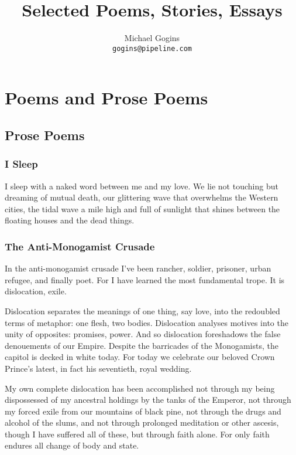\documentclass[english,11pt,letterpaper,onecolumn]{scrbook}
\begin{document}
\pagestyle{plain}
\frontmatter

\title{Selected Poems, Stories, Essays}
\author{Michael Gogins \\ \texttt{gogins@pipeline.com}}
\maketitle

\tableofcontents
\mainmatter
\pagestyle{headings}

\part{Poems and Prose Poems}

\chapter{Prose Poems}

\section{I Sleep}

	I sleep with a naked word between me and my love.  We lie not touching but dreaming of mutual death, our glittering wave that overwhelms the Western cities, the tidal wave a mile high and full of sunlight that shines between the floating houses and the dead things.



\newpage
\section{The Anti-Monogamist Crusade}

	In the anti-monogamist crusade I've been rancher, soldier, prisoner, urban refugee, and finally poet.  For I have learned the most fundamental trope.  It is dislocation, exile.

	Dislocation separates the meanings of one thing, say love, into the redoubled terms of metaphor:  one flesh, two bodies.  Dislocation analyses motives into the unity of opposites:  promises, power.  And so dislocation foreshadows the false denouements of our Empire.  Despite the barricades of the Monogamists, the capitol is decked in white today.  For today we celebrate our beloved Crown Prince's latest, in fact his seventieth, royal wedding.

	My own complete dislocation has been accomplished not through my being dispossessed of my ancestral holdings by the tanks of the Emperor, not through my forced exile from our mountains of black pine, not through the drugs and alcohol of the slums, and not through prolonged meditation or other ascesis, though I have suffered all of these, but through faith alone.  For only faith endures all change of body and state.
\end{document}
